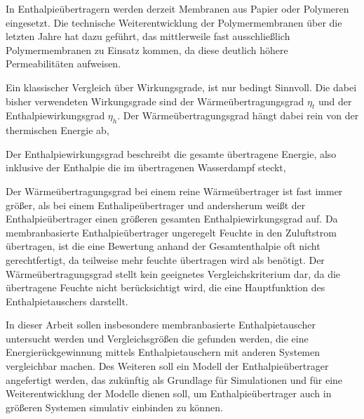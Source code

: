 \begin{normalsize}
\begin{LARGE}
In Enthalpieübertragern werden derzeit Membranen aus Papier oder Polymeren eingesetzt. Die technische Weiterentwicklung der Polymermembranen über die letzten Jahre hat dazu geführt, das mittlerweile fast ausschließlich Polymermembranen zu Einsatz kommen, da diese deutlich höhere Permeabilitäten aufweisen. 





Ein klassischer Vergleich über Wirkungsgrade, ist nur bedingt Sinnvoll. Die dabei bisher verwendeten Wirkungsgrade sind der Wärmeübertragungsgrad $\eta_{t}$ und der Enthalpiewirkungsgrad $\eta_{h}$. Der Wärmeübertragungsgrad hängt dabei rein von der thermischen Energie ab, 


Der Enthalpiewirkungsgrad beschreibt die gesamte übertragene Energie, also inklusive der Enthalpie die im übertragenen Wasserdampf steckt,


Der Wärmeübertragungsgrad bei einem reine Wärmeübertrager ist fast immer größer, als bei einem Enthalipeübertrager und andersherum weißt der Enthalpieübertrager einen größeren gesamten Enthalpiewirkungsgrad auf.  Da membranbasierte Enthalpieübertrager ungeregelt Feuchte in den Zuluftstrom übertragen, ist die eine Bewertung anhand der Gesamtenthalpie oft nicht gerechtfertigt, da teilweise mehr feuchte übertragen wird als benötigt. %
Der Wärmeübertragungsgrad stellt kein geeignetes Vergleichskriterium dar, da die übertragene Feuchte nicht berücksichtigt wird, die eine Hauptfunktion des Enthalpietauschers darstellt.




In dieser Arbeit sollen insbesondere membranbasierte Enthalpietauscher untersucht werden und Vergleichsgrößen die gefunden werden, die eine Energierückgewinnung mittels Enthalpietauschern mit anderen Systemen vergleichbar machen. Des Weiteren soll ein Modell der Enthalpieübertrager angefertigt werden, das zukünftig als Grundlage für Simulationen und für eine Weiterentwicklung der Modelle dienen soll, um Enthalpieübertrager auch in größeren Systemen simulativ einbinden zu können.  



\end{LARGE}
\end{normalsize}
